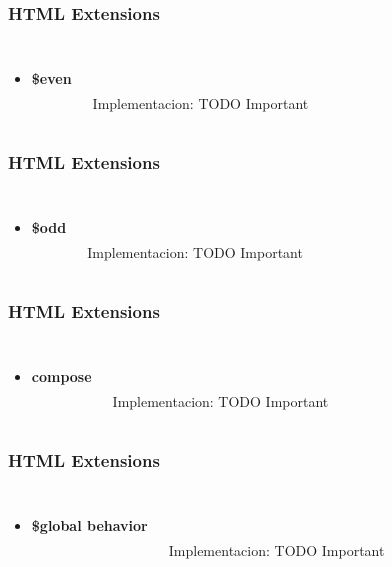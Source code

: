 \documentclass{beamer}
\begin{document}
\begin{frame}
\frametitle{HTML Extensions}
\begin{columns}[c]
\begin{itemize}
\item \textbf{\$even}
\end{itemize}

\\~\\
Implementacion: TODO Important
\end{columns}
\end{frame}
\begin{frame}
\frametitle{HTML Extensions}
\begin{columns}[c]
\begin{itemize}
\item \textbf{\$odd}
\end{itemize}

\\~\\
Implementacion: TODO Important
\end{columns}
\end{frame}
\begin{frame}
\frametitle{HTML Extensions}
\begin{columns}[c]
\begin{itemize}
\item \textbf{compose}
\end{itemize}

\\~\\
Implementacion: TODO Important
\end{columns}
\end{frame}
\begin{frame}
\frametitle{HTML Extensions}
\begin{columns}[c]
\begin{itemize}
\item \textbf{\$global behavior}
\end{itemize}

\\~\\
Implementacion: TODO Important
\end{columns}
\end{frame}
\end{document}
